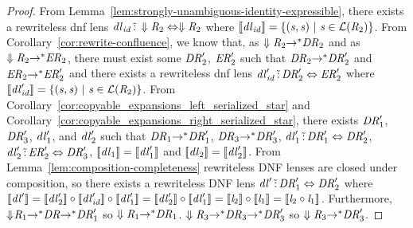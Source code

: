 \documentclass[numbers,10pt,preprint\ifanon ,nocopyrightspace\fi]{sigplanconf}
\begin{document}
\begin{proof}
  From Lemma~\ref{lem:strongly-unambiguous-identity-expressible}, there exists
  a rewriteless dnf lens
  $\mathit{dl}_{\mathit{id}} \,\tilde{:}\, \Downarrow{\ensuremath{\mathit{R}}_2} \Leftrightarrow
  \Downarrow{\ensuremath{\mathit{R}}_2}$ where $[ \! [\mathit{dl}_{\mathit{id}}] \! ] =
  \{(\mathit{s},\mathit{s})~|~ \mathit{s}\in\mathcal{L}(\mathit{R}_2)\}$.
  From Corollary~\ref{cor:rewrite-confluence}, we know that, as
  $\Downarrow{\ensuremath{\mathit{R}}_2}{\ensuremath{\rightarrow}}^*\mathit{DR}_2$ and as
  $\Downarrow{\ensuremath{\mathit{R}}_2}{\ensuremath{\rightarrow}}^*\mathit{ER}_2$, there must exist some
  $\mathit{DR}_2'$, $\mathit{ER}_2'$ such that
  $\mathit{DR}_2{\rightarrow}^*\mathit{DR}_2'$ and
  $\mathit{ER}_2{\rightarrow}^*\mathit{ER}_2'$ and there exists a rewriteless dnf
  lens $\mathit{dl}_{\mathit{id}}' \,\tilde{:}\, \mathit{DR}_2' \Leftrightarrow
  \mathit{ER}_2'$ where $[ \! [\mathit{dl}_{\mathit{id}}'] \! ] =
  \{(\mathit{s},\mathit{s})~|~ \mathit{s}\in\mathcal{L}(\mathit{R}_2)\}$.
  From Corollary~\ref{cor:copyable_expansions_left_serialized_star} and
  Corollary~\ref{cor:copyable_expansions_right_serialized_star}, there exists
  $\mathit{DR}_1'$, $\mathit{DR}_3'$, $\mathit{dl}_1'$, and $\mathit{dl}_2'$ such that
  $\mathit{DR}_1{\rightarrow}^*\mathit{DR}_1'$, $\mathit{DR}_3{\rightarrow}^*\mathit{DR}_3'$,
  $\mathit{dl}_1' \,\tilde{:}\, \mathit{DR}_1' \Leftrightarrow \mathit{DR}_2'$,
  $\mathit{dl}_2' \,\tilde{:}\, \mathit{ER}_2' \Leftrightarrow \mathit{DR}_3'$,
  $[ \! [\mathit{dl}_1] \! ] = [ \! [\mathit{dl}_1'] \! ]$ and
  $[ \! [\mathit{dl}_2] \! ] = [ \! [\mathit{dl}_2'] \! ]$.  From
  Lemma~\ref{lem:composition-completeness}
  rewriteless DNF lenses are closed under composition, so there exists a
  rewriteless DNF lens $\mathit{dl}' \,\tilde{:}\, \mathit{DR}_1' \Leftrightarrow
  \mathit{DR}_2'$ where $\SemanticsOf{\DNFLens'} = \SemanticsOf{\DNFLens_2'}
  \Compose \SemanticsOf{\DNFLens_{\IdentityLens}'} \Compose
  \SemanticsOf{\DNFLens_1'} = \SemanticsOf{\DNFLens_2'} \Compose
  \SemanticsOf{\DNFLens_1'} = \SemanticsOf{\Lens_2} \Compose
  \SemanticsOf{\Lens_1} = \SemanticsOf{\Lens_2\Compose\Lens_1}$.  Furthermore,
  $\Downarrow\mkern-4mu \mathit{R}_1 {\rightarrow}^* \mathit{DR} {\rightarrow}^* \mathit{DR}_1'$ so
  $\Downarrow{\ensuremath{\mathit{R}}_1} {\ensuremath{\rightarrow}}^* \mathit{DR}_1$. $\Downarrow{\ensuremath{\mathit{R}}_3}
  {\ensuremath{\rightarrow}}^* \mathit{DR}_3 {\rightarrow}^* \mathit{DR}_3'$ so $\Downarrow{\ensuremath{\mathit{R}}_3}
  {\ensuremath{\rightarrow}}^* \mathit{DR}_3'$.


\end{proof}
\end{document}
